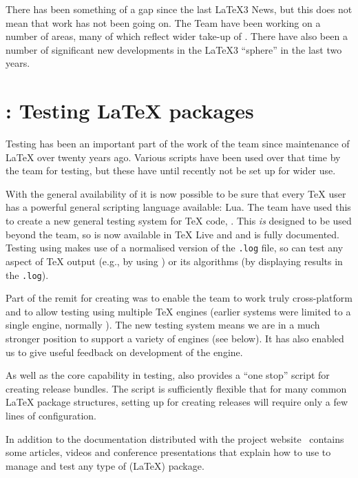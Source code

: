\documentclass{ltnews}
\begin{document}
\maketitle

There has been something of a gap since the last \LaTeX3 News, but this does
not mean that work has not been going on. The Team have been working on a
number of areas, many of which reflect wider take-up of . There have
also been a number of significant new developments in the \LaTeX3
\enquote{sphere} in the last two years.

\section{: Testing \LaTeX{} packages}

Testing has been an important part of the work of the team since maintenance of
\LaTeX{} over twenty years ago. Various scripts have been used over that time
by the team for testing, but these have until recently not be set up for wider
use.

With the general availability of  it is now possible to be sure
that every \TeX{} user has a powerful general scripting language available:
Lua. The team have used this to create a new general testing system for \TeX{}
code, . This \emph{is} designed to be used beyond the team, so is
now available in \TeX{} Live and  and is fully documented.
Testing using  makes use of a normalised version of the
\texttt{.log} file, so can test any aspect of \TeX{} output (e.g., by using
) or its algorithms (by displaying results in the \texttt{.log}).

Part of the remit for creating  was to enable the team to work
truly cross-platform and to allow testing using multiple \TeX{} engines
(earlier systems were limited to a single engine, normally \eTeX{}). The new
testing system means we are in a much stronger position to support a variety of
engines (see below). It has also enabled us to give useful feedback on
development of the  engine.

As well as the core capability in testing,  also provides a
\enquote{one stop} script for creating release bundles. The script is
sufficiently flexible that for many common \LaTeX{} package structures, setting
up for creating releases will require only a few lines of configuration.

In addition to the documentation distributed with  the project
website~\cite[publications in 2014]{project-publications} contains
some articles, videos and conference presentations that explain how to
use  to manage and test any type of (\LaTeX{}) package.
\end{document}
